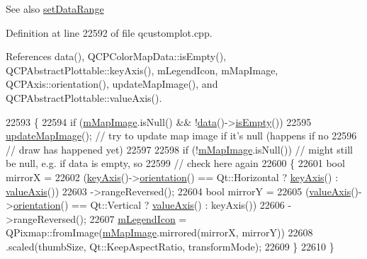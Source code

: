 \begin{DoxySeeAlso}{See also}
\hyperlink{class_q_c_p_color_map_a980b42837821159786a85b4b7dcb8774}{set\+Data\+Range} 
\end{DoxySeeAlso}


Definition at line 22592 of file qcustomplot.\+cpp.



References data(), Q\+C\+P\+Color\+Map\+Data\+::is\+Empty(), Q\+C\+P\+Abstract\+Plottable\+::key\+Axis(), m\+Legend\+Icon, m\+Map\+Image, Q\+C\+P\+Axis\+::orientation(), update\+Map\+Image(), and Q\+C\+P\+Abstract\+Plottable\+::value\+Axis().


\begin{DoxyCode}
22593                                                            \{
22594   \textcolor{keywordflow}{if} (\hyperlink{class_q_c_p_color_map_a66110813b42eca78b64095b2a1f285a0}{mMapImage}.isNull() && !\hyperlink{class_q_c_p_color_map_a3ae12c9ce842352037cd20ea5267414f}{data}()->\hyperlink{class_q_c_p_color_map_data_a986009324aee1fc5f696db46bd03dde5}{isEmpty}())
22595     \hyperlink{class_q_c_p_color_map_a5efcea591bb5486d968af520a4d43c3a}{updateMapImage}(); \textcolor{comment}{// try to update map image if it's null (happens if no}
22596                       \textcolor{comment}{// draw has happened yet)}
22597 
22598   \textcolor{keywordflow}{if} (!\hyperlink{class_q_c_p_color_map_a66110813b42eca78b64095b2a1f285a0}{mMapImage}.isNull()) \textcolor{comment}{// might still be null, e.g. if data is empty, so}
22599                            \textcolor{comment}{// check here again}
22600   \{
22601     \textcolor{keywordtype}{bool} mirrorX =
22602         (\hyperlink{class_q_c_p_abstract_plottable_a72c7a09c22963f2c943f07112b311103}{keyAxis}()->\hyperlink{class_q_c_p_axis_a57483f2f60145ddc9e63f3af53959265}{orientation}() == Qt::Horizontal ? \hyperlink{class_q_c_p_abstract_plottable_a72c7a09c22963f2c943f07112b311103}{keyAxis}() : 
      \hyperlink{class_q_c_p_abstract_plottable_a3106f9d34d330a6097a8ec5905e5b519}{valueAxis}())
22603             ->rangeReversed();
22604     \textcolor{keywordtype}{bool} mirrorY =
22605         (\hyperlink{class_q_c_p_abstract_plottable_a3106f9d34d330a6097a8ec5905e5b519}{valueAxis}()->\hyperlink{class_q_c_p_axis_a57483f2f60145ddc9e63f3af53959265}{orientation}() == Qt::Vertical ? 
      \hyperlink{class_q_c_p_abstract_plottable_a3106f9d34d330a6097a8ec5905e5b519}{valueAxis}() : keyAxis())
22606             ->rangeReversed();
22607     \hyperlink{class_q_c_p_color_map_ada522988db02cb531767d38c5029ef60}{mLegendIcon} = QPixmap::fromImage(\hyperlink{class_q_c_p_color_map_a66110813b42eca78b64095b2a1f285a0}{mMapImage}.mirrored(mirrorX, mirrorY))
22608                       .scaled(thumbSize, Qt::KeepAspectRatio, transformMode);
22609   \}
22610 \}
\end{DoxyCode}


